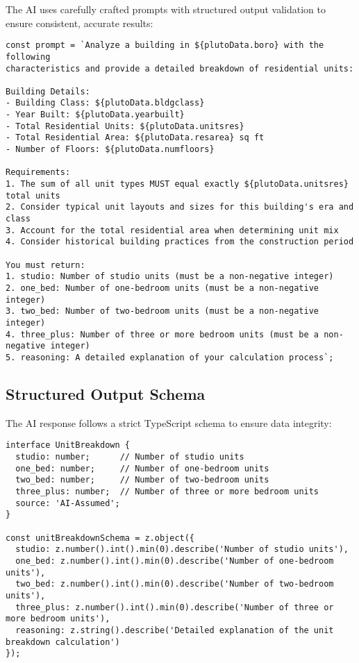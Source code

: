 \documentclass{article}
\begin{document}
The AI uses carefully crafted prompts with structured output validation to ensure consistent, accurate results:

\begin{lstlisting}
const prompt = `Analyze a building in ${plutoData.boro} with the following 
characteristics and provide a detailed breakdown of residential units:

Building Details:
- Building Class: ${plutoData.bldgclass}
- Year Built: ${plutoData.yearbuilt}
- Total Residential Units: ${plutoData.unitsres}
- Total Residential Area: ${plutoData.resarea} sq ft
- Number of Floors: ${plutoData.numfloors}

Requirements:
1. The sum of all unit types MUST equal exactly ${plutoData.unitsres} total units
2. Consider typical unit layouts and sizes for this building's era and class
3. Account for the total residential area when determining unit mix
4. Consider historical building practices from the construction period

You must return:
1. studio: Number of studio units (must be a non-negative integer)
2. one_bed: Number of one-bedroom units (must be a non-negative integer)  
3. two_bed: Number of two-bedroom units (must be a non-negative integer)
4. three_plus: Number of three or more bedroom units (must be a non-negative integer)
5. reasoning: A detailed explanation of your calculation process`;
\end{lstlisting}

\subsection{Structured Output Schema}

The AI response follows a strict TypeScript schema to ensure data integrity:

\begin{lstlisting}
interface UnitBreakdown {
  studio: number;      // Number of studio units
  one_bed: number;     // Number of one-bedroom units  
  two_bed: number;     // Number of two-bedroom units
  three_plus: number;  // Number of three or more bedroom units
  source: 'AI-Assumed';
}

const unitBreakdownSchema = z.object({
  studio: z.number().int().min(0).describe('Number of studio units'),
  one_bed: z.number().int().min(0).describe('Number of one-bedroom units'),
  two_bed: z.number().int().min(0).describe('Number of two-bedroom units'),
  three_plus: z.number().int().min(0).describe('Number of three or more bedroom units'),
  reasoning: z.string().describe('Detailed explanation of the unit breakdown calculation')
});
\end{lstlisting}
\end{document}
